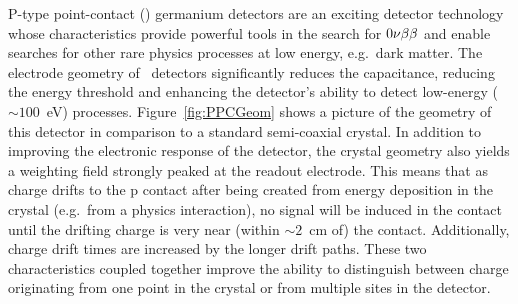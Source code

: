   P-type point-contact (\ppc) germanium detectors are an exciting detector
technology whose characteristics provide powerful tools in the search for
$0 \nu \beta \beta$ and enable searches for other rare physics processes at low energy, e.g.~dark matter.  
The electrode geometry of \ppc~detectors significantly reduces the
capacitance, reducing the energy threshold and enhancing the detector's
ability to detect low-energy ($\sim100$~eV) processes.  Figure~\ref{fig:PPCGeom} shows a picture of the geometry of this detector in comparison to a standard semi-coaxial crystal.  In addition to improving the electronic response of the detector, the crystal geometry also yields a weighting field strongly peaked at the readout electrode.  This means that as charge drifts to the p contact after being created from energy deposition in the crystal (e.g.~from a physics interaction), no signal will be induced in the contact until the drifting charge is very near (within $\sim2$~cm of) the contact.  Additionally, charge drift times are increased by the longer drift paths.  These two characteristics coupled together improve the ability to distinguish between charge originating from one point in the crystal or from multiple sites in the detector.

